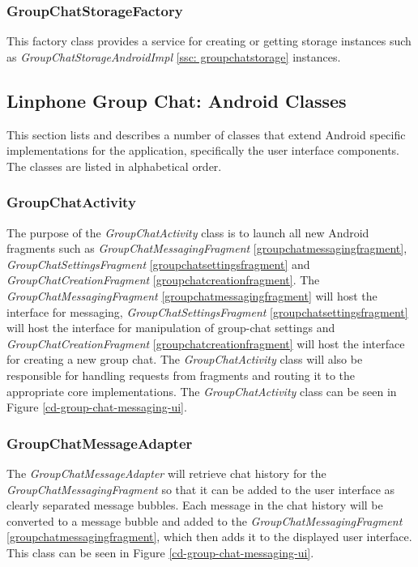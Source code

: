 \documentclass[11pt]{article}
\begin{document}
\subsubsection{GroupChatStorageFactory}\label{ssc: groupchatstoragefactory}
This factory class provides a service for creating or getting storage instances such as \textit{GroupChatStorageAndroidImpl} \ref{ssc: groupchatstorage} instances.




\subsection{Linphone Group Chat: Android Classes}\label{subsec: androidclasses}
This section lists and describes a number of classes that extend Android specific implementations for the application, specifically the user interface components. The classes are listed in alphabetical order.
\subsubsection{GroupChatActivity}\label{ssc: groupchatactivity}
The purpose of the \textit{GroupChatActivity} class is to launch all new Android fragments such as \textit{GroupChatMessagingFragment} \ref{groupchatmessagingfragment}, \textit{GroupChatSettingsFragment} \ref{groupchatsettingsfragment} and \textit{GroupChatCreationFragment} \ref{groupchatcreationfragment}. The \textit{GroupChatMessagingFragment} \ref{groupchatmessagingfragment} will host the interface for messaging, \textit{GroupChatSettingsFragment} \ref{groupchatsettingsfragment} will host the interface for manipulation of group-chat settings and \textit{GroupChatCreationFragment} \ref{groupchatcreationfragment} will host the interface for creating a new group chat. The \textit{GroupChatActivity} class will also be responsible for handling requests from fragments and routing it to the appropriate core implementations. The \textit{GroupChatActivity} class can be seen in Figure \ref{cd-group-chat-messaging-ui}.
\subsubsection{GroupChatMessageAdapter}\label{groupchatmessageadapter}
The \textit{GroupChatMessageAdapter} will retrieve chat history for the \textit{GroupChatMessagingFragment} so that it can be added to the user interface as clearly separated message bubbles. Each message in the chat history will be converted to a message bubble and added to the \textit{GroupChatMessagingFragment} \ref{groupchatmessagingfragment}, which then adds it to the displayed user interface. This class can be seen in Figure \ref{cd-group-chat-messaging-ui}.
\end{document}
